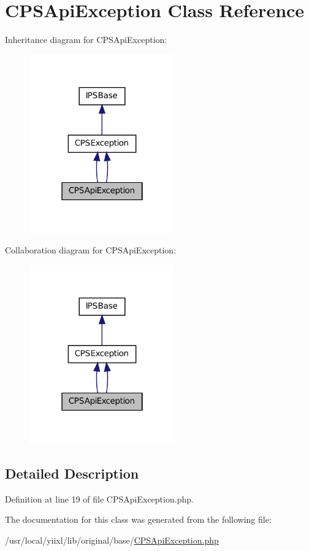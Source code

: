 \hypertarget{classCPSApiException}{
\section{CPSApiException Class Reference}
\label{classCPSApiException}
}


Inheritance diagram for CPSApiException:\nopagebreak
\begin{figure}[H]
\begin{center}
\leavevmode
\includegraphics[width=178pt]{classCPSApiException__inherit__graph}
\end{center}
\end{figure}


Collaboration diagram for CPSApiException:\nopagebreak
\begin{figure}[H]
\begin{center}
\leavevmode
\includegraphics[width=178pt]{classCPSApiException__coll__graph}
\end{center}
\end{figure}


\subsection{Detailed Description}


Definition at line 19 of file CPSApiException.php.



The documentation for this class was generated from the following file:\begin{DoxyCompactItemize}
\item 
/usr/local/yiixl/lib/original/base/\hyperlink{CPSApiException_8php}{CPSApiException.php}\end{DoxyCompactItemize}
